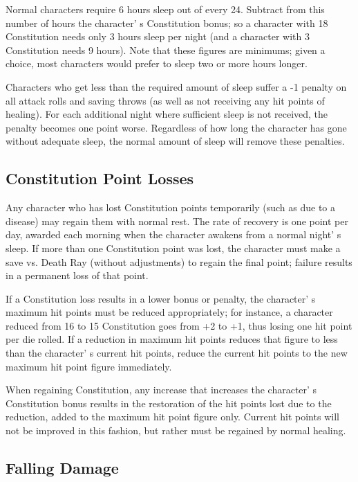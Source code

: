 \documentclass[a4paper,twoside,openany,10pt]{book}
\begin{document}
\begin{multicols}{2}
Normal characters require 6 hours sleep out of every 24. Subtract from this number of hours the character' s Constitution bonus; so a character with 18 Constitution needs only 3 hours sleep per night (and a character with 3 Constitution needs 9 hours). Note that these figures are minimums; given a choice, most characters would prefer to sleep two or more hours longer.

Characters who get less than the required amount of sleep suffer a -1 penalty on all attack rolls and saving throws (as well as not receiving any hit points of healing). For each additional night where sufficient sleep is not received, the penalty becomes one point worse. Regardless of how long the character has gone without adequate sleep, the normal amount of sleep will remove these penalties.


\subsection{Constitution Point Losses}\label{constitution-point-losses}

Any character who has lost Constitution points temporarily (such as due to a disease) may regain them with normal rest. The rate of recovery is one point per day, awarded each morning when the character awakens from a normal night' s sleep. If more than one Constitution point was lost, the character must make a save vs. Death Ray (without adjustments) to regain the final point; failure results in a permanent loss of that point.

If a Constitution loss results in a lower bonus or penalty, the character' s maximum hit points must be reduced appropriately; for instance, a character reduced from 16 to 15 Constitution goes from +2 to +1, thus losing one hit point per die rolled. If a reduction in maximum hit points reduces that figure to less than the character' s current hit points, reduce the current hit points to the new maximum hit point figure immediately.

When regaining Constitution, any increase that increases the character' s Constitution bonus results in the restoration of the hit points lost due to the reduction, added to the maximum hit point figure only. Current hit points will not be improved in this fashion, but rather must be regained by normal healing.

\subsection{Falling Damage}\label{falling-damage}


\end{multicols}
\end{document}
